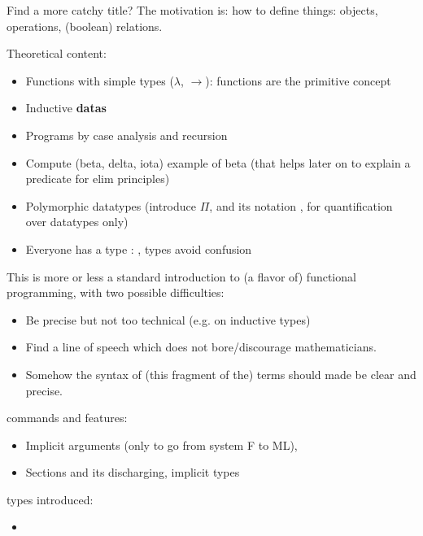 
Find a more catchy title? The motivation is: how to define things:
objects, operations, (boolean) relations.

Theoretical content:
\begin{itemize}
\item Functions with simple types ($\lambda$, $\rightarrow$): functions are the primitive concept
\item Inductive {\bf datas}
\item Programs by case analysis and recursion
\item Compute (beta, delta, iota) example of beta (that helps later on to explain a predicate for elim principles)
\item Polymorphic datatypes (introduce $\Pi$, and its \Coq{} notation
  , for quantification over datatypes only)
\item Everyone has a type : , types avoid confusion
\end{itemize}
This is more or less a standard introduction to (a flavor of)
functional programming, with two possible difficulties:
\begin{itemize}
\item Be precise but not too technical (e.g. on inductive types)
\item Find a line of speech which does not bore/discourage
  mathematicians.
\item Somehow the syntax of (this fragment of the) terms should made
  be clear and precise.
\end{itemize}

\Coq{} commands and features:
\begin{itemize}
\item Implicit arguments (only to go from system F to ML), 
\item Sections and its discharging, implicit types
\end{itemize}


\Coq{} types introduced:
\begin{itemize}
\item {}
\end{itemize}

